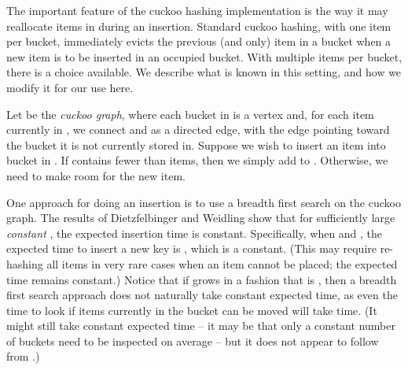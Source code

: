 \documentclass[11pt,letterpaper]{article}
\begin{document}
The important feature of the cuckoo hashing implementation is the way
it may reallocate items in  during an insertion.  Standard
cuckoo hashing, with one item per bucket, immediately evicts the
previous (and only) item in a bucket when a new item is to be inserted
in an occupied bucket.  With multiple items per bucket, there is a
choice available.  We describe what is known in this setting, and how
we modify it for our use here.

Let  be the \emph{cuckoo graph}, where each bucket in  is a
vertex and, for each item  currently in , we connect
 and  as a directed edge, with the edge
pointing toward the bucket it is not currently stored in.  Suppose we
wish to insert an item  into bucket  in .  If 
contains fewer than  items, then we simply add  to .
Otherwise, we need to make room for the new item.  

One approach for doing an insertion is to use a breadth first search
on the cuckoo graph.  The results of Dietzfelbinger and Weidling show
that for sufficiently large {\em constant} , the expected insertion
time is constant.  Specifically, when  and
, the expected time to insert a new key is
, which is a constant.
(This may require re-hashing all items in very rare cases when an
item cannot be placed; the expected time remains constant.) Notice
that if  grows in a fashion that is , then a breadth
first search approach does not naturally take constant expected time,
as even the time to look if items currently in the bucket can be moved
will take  time.  (It might still take constant expected
time -- it may be that only a constant number of buckets need to be
inspected on average -- but it does not appear to follow
from \cite{dw-badtpcs-07}.)
\end{document}
